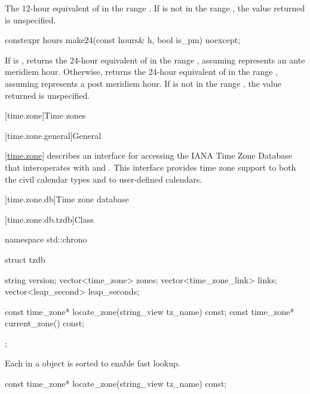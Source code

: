 \begin{itemdescr}
\pnum
\returns
The 12-hour equivalent of  in the range .
If  is not in the range ,
the value returned is unspecified.
\end{itemdescr}

%
\begin{itemdecl}
constexpr hours make24(const hours& h, bool is_pm) noexcept;
\end{itemdecl}

\begin{itemdescr}
\pnum
\returns
If  is ,
returns the 24-hour equivalent of 
in the range ,
assuming  represents an ante meridiem hour.
Otherwise,
returns the 24-hour equivalent of 
in the range ,
assuming  represents a post meridiem hour.
If  is not in the range ,
the value returned is unspecified.
\end{itemdescr}

[time.zone]{Time zones}

[time.zone.general]{General}

\pnum
\ref{time.zone} describes an interface for accessing
the IANA Time Zone Database\supercite{iana-tz}
that interoperates with  and .
This interface provides time zone support to
both the civil calendar types
and to user-defined calendars.

[time.zone.db]{Time zone database}

[time.zone.db.tzdb]{Class }

\begin{codeblock}
namespace std::chrono {
  struct tzdb {
    string                 version;
    vector<time_zone>      zones;
    vector<time_zone_link> links;
    vector<leap_second>    leap_seconds;

    const time_zone* locate_zone(string_view tz_name) const;
    const time_zone* current_zone() const;
  };
}
\end{codeblock}

\pnum
Each  in a  object
is sorted to enable fast lookup.

%
\begin{itemdecl}
const time_zone* locate_zone(string_view tz_name) const;
\end{itemdecl}


